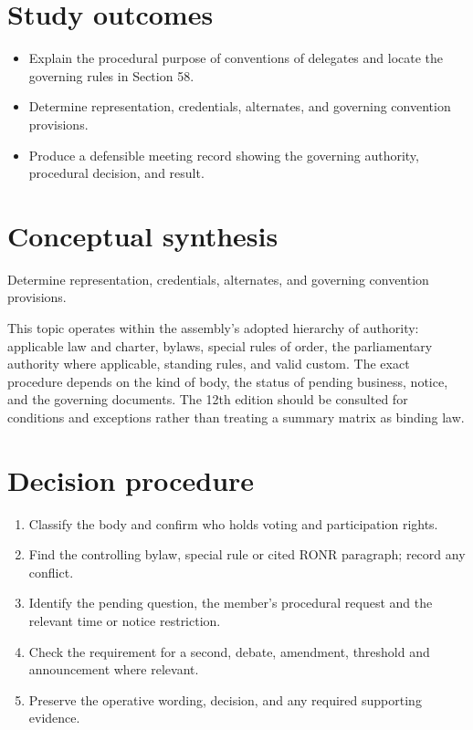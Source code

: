 \documentclass[11pt]{article}
\begin{document}
\SuiteOpen
{}
\section{Study outcomes}
\begin{itemize}[leftmargin=*,itemsep=4pt]
\item Explain the procedural purpose of conventions of delegates and locate the governing rules in Section 58.
\item Determine representation, credentials, alternates, and governing convention provisions.
\item Produce a defensible meeting record showing the governing authority, procedural decision, and result.
\end{itemize}

\section{Conceptual synthesis}
Determine representation, credentials, alternates, and governing convention provisions.

This topic operates within the assembly’s adopted hierarchy of authority: applicable law and charter, bylaws, special rules of order, the parliamentary authority where applicable, standing rules, and valid custom. The exact procedure depends on the kind of body, the status of pending business, notice, and the governing documents. The 12th edition should be consulted for conditions and exceptions rather than treating a summary matrix as binding law.
\section{Decision procedure}
\begin{enumerate}[leftmargin=*,itemsep=4pt]
\item Classify the body and confirm who holds voting and participation rights.
\item Find the controlling bylaw, special rule or cited RONR paragraph; record any conflict.
\item Identify the pending question, the member’s procedural request and the relevant time or notice restriction.
\item Check the requirement for a second, debate, amendment, threshold and announcement where relevant.
\item Preserve the operative wording, decision, and any required supporting evidence.
\end{enumerate}
\end{document}

